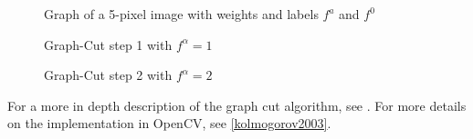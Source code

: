 \documentclass[a4paper]{article}
\begin{document}
\begin{figure}[h!bt]
\centering

\caption{Graph of a 5-pixel image with weights and labels $f^a$ and $f^0$}
\label{fig:gc_end_result}
\end{figure}

\begin{figure}[h!bt]
\centering


\caption{Graph-Cut step 1 with $f^\alpha = 1$}
\end{figure}
\begin{figure}[h!bt]
\centering


\caption{Graph-Cut step 2 with $f^\alpha = 2$}
\end{figure}

For a more in depth description of the graph cut algorithm, see
\cite{zabih2001}. For more details on the implementation in OpenCV,
see \ref{kolmogorov2003}.
\end{document}
